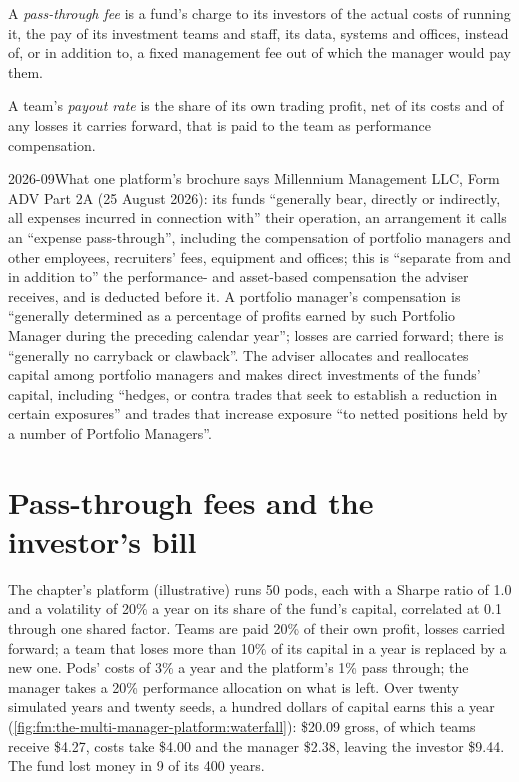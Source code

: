 \begin{definition}\label{def:fm:the-multi-manager-platform:pass}
A \emph{pass-through fee} is a fund's charge to its investors of the actual costs of running it, the pay of its
investment teams and staff, its data, systems and offices, instead of, or in addition to, a fixed management fee out of which the manager would
pay them.
\end{definition}

\begin{definition}\label{def:fm:the-multi-manager-platform:payout}
A team's \emph{payout rate} is the share of its own trading profit, net of its costs and of any losses it carries forward, that
is paid to the team as performance compensation.
\end{definition}

\begin{dated}{2026-09}{What one platform's brochure says}\label{dat:fm:the-multi-manager-platform:adv}
Millennium Management LLC, Form ADV Part 2A (25 August 2026): its funds ``generally bear, directly or indirectly, all expenses incurred in
connection with'' their operation, an arrangement it calls an ``expense pass-through'', including the compensation of portfolio managers and other
employees, recruiters' fees, equipment and offices; this is ``separate from and in addition to'' the performance- and asset-based compensation the
adviser receives, and is deducted before it. A portfolio manager's compensation is ``generally determined as a percentage of profits earned by
such Portfolio Manager during the preceding calendar year''; losses are carried forward; there is ``generally no carryback or clawback''. The
adviser allocates and reallocates capital among portfolio managers and makes direct investments of the funds' capital, including ``hedges, or
contra trades that seek to establish a reduction in certain exposures'' and trades that increase exposure ``to netted positions held by a number
of Portfolio Managers''.
\end{dated}

\section{Pass-through fees and the investor's bill}

The chapter's platform (illustrative) runs 50 pods, each with a Sharpe ratio of 1.0 and a volatility of 20\% a year on its share of the fund's
capital, correlated at 0.1 through one shared factor. Teams are paid 20\% of their own profit, losses carried forward; a team that loses more
than 10\% of its capital in a year is replaced by a new one. Pods' costs of 3\% a year and the platform's 1\% pass through; the manager takes a
20\% performance allocation on what is left. Over twenty simulated years and twenty seeds, a hundred dollars of capital earns this a year
(\cref{fig:fm:the-multi-manager-platform:waterfall}): \$20.09 gross, of which teams receive \$4.27, costs take \$4.00 and the manager \$2.38,
leaving the investor \$9.44. The fund lost money in 9 of its 400 years.

